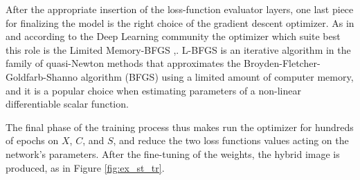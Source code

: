 After the appropriate insertion of the loss-function evaluator layers, one last piece for finalizing the model is the right choice of the gradient descent optimizer. As in \cite{1508.06576} and according to the Deep Learning community the optimizer which suite best this role is the Limited Memory-BFGS \cite{10.1093/imamat/6.1.76},\cite{shanno1970conditioning}. L-BFGS is an iterative algorithm in the family of quasi-Newton methods that approximates the Broyden-Fletcher-Goldfarb-Shanno algorithm (BFGS) using a limited amount of computer memory, and it is a popular choice when estimating parameters of a non-linear differentiable scalar function.

The final phase of the training process thus makes run the optimizer for hundreds of epochs on $X$, $C$, and $S$, and reduce the two loss functions values acting on the network's parameters. After the fine-tuning of the weights, the hybrid image is produced, as in Figure \ref{fig:ex_st_tr}.
